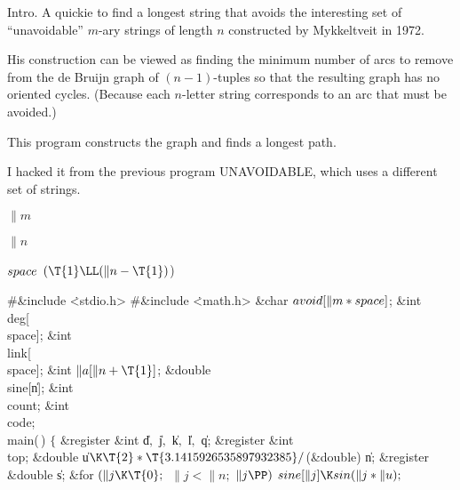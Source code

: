 
\hypertextrue\srcloctrue
\datethis

Intro. A quickie to find a longest string that avoids
the interesting
set of ``unavoidable'' $m$-ary strings of length $n$ constructed by
Mykkeltveit in 1972.

His construction can be viewed as finding the minimum number of arcs
to remove from the de Bruijn graph of $(n-1)$-tuples so that the
resulting graph has no oriented cycles. (Because each $n$-letter string
corresponds to an arc that must be avoided.)

This program constructs the graph and finds a longest path.

I hacked it from the previous program {\mc UNAVOIDABLE}, which uses
a different set of strings.

\Y\B\4\D$\|m$ \5
\par
\B\4\D$\|n$ \5
\par
\B\4\D$\\{space}$ \5
$(\T{1}\LL(\|n-\T{1}){}$)\par
\Y\B\8\#\&{include} \.{<stdio.h>}\6
\8\#\&{include} \.{<math.h>}\6
\&{char} ${}\\{avoid}[\|m*\\{space}]{}$;\6
\&{int} \\{deg}[\\{space}];\6
\&{int} \\{link}[\\{space}];\6
\&{int} ${}\|a[\|n+\T{1}]{}$;\6
\&{double} \\{sine}[\|n];\6
\&{int} \\{count};\6
\&{int} \\{code};\7
\\{main}(\,)\1\1\2\2\6
${}\{{}$\1\6
\&{register} \&{int} \|d${},{}$ \|j${},{}$ \|k${},{}$ \|l${},{}$ \|q;\6
\&{register} \&{int} \\{top};\6
\&{double} \|u${}\K\T{2}*\T{3.1415926535897932385}/{}$(\&{double}) \|n;\6
\&{register} \&{double} \|s;\7
\&{for} ${}(\|j\K\T{0};{}$ ${}\|j<\|n;{}$ ${}\|j\PP){}$\1\5
${}\\{sine}[\|j]\K\\{sin}(\|j*\|u);{}$\2\6
